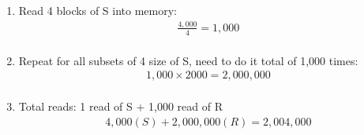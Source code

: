\documentclass[12pt]{extarticle}
\begin{document}
\begin{flushleft}
\begin{enumerate}
\begin{enumerate}

\item Read 4 blocks of S into memory:
\begin{align*}
    \frac{4,000}{4} = 1,000 \\
\end{align*}


\item Repeat for all subsets of 4 size of S, need to do it total of 1,000 times:
\begin{align*}
    1,000 \times 2000 = 2,000,000 \\
\end{align*}

\item Total reads: 1 read of S + 1,000 read of R\\
\begin{align*}
    4,000 (S) + 2,000,000 (R) = \boxed{2,004,000}
\end{align*}
\end{enumerate}

\end{enumerate}
\end{flushleft}
\end{document}
